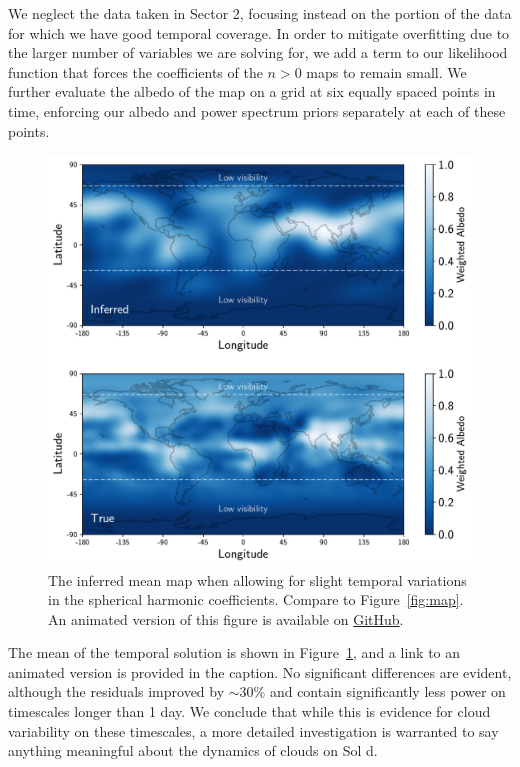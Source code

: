 \documentclass[modern]{aastex62}
\begin{document}
We neglect the data taken in Sector 2, focusing instead on the portion of the data for which
we have good temporal coverage. In order to mitigate overfitting due to
the larger number of variables we are solving for,
we add a term to our likelihood function that forces the coefficients
of the $n > 0$ maps to remain small. We further evaluate the albedo of the map
on a grid at six equally spaced points in time, enforcing our albedo and
power spectrum priors separately at each of these points.

\begin{figure}[p!]
    \begin{centering}
    \includegraphics[width=\linewidth]{figures/map_temporal.pdf}
    \caption{\label{fig:map_temporal}
             The inferred mean map when allowing for slight temporal
             variations in the spherical harmonic coefficients. Compare
             to Figure~\ref{fig:map}. An animated version of this figure
             is available on 
             \href{https://github.com/rodluger/earthshine/blob/master/tex/figures/map_temporal.mp4}{GitHub}.
             }
    \end{centering}
\end{figure}

The mean of the temporal solution is shown in Figure~\ref{fig:map_temporal},
and a link to an animated version is provided in the caption. No significant
differences are evident, although the residuals improved by ${\sim}30\%$
and contain significantly less power on timescales longer than 1 day.
We conclude that while this is evidence for cloud variability on these
timescales, a more detailed investigation is warranted to say anything
meaningful about the dynamics of clouds on Sol d.
\end{document}
